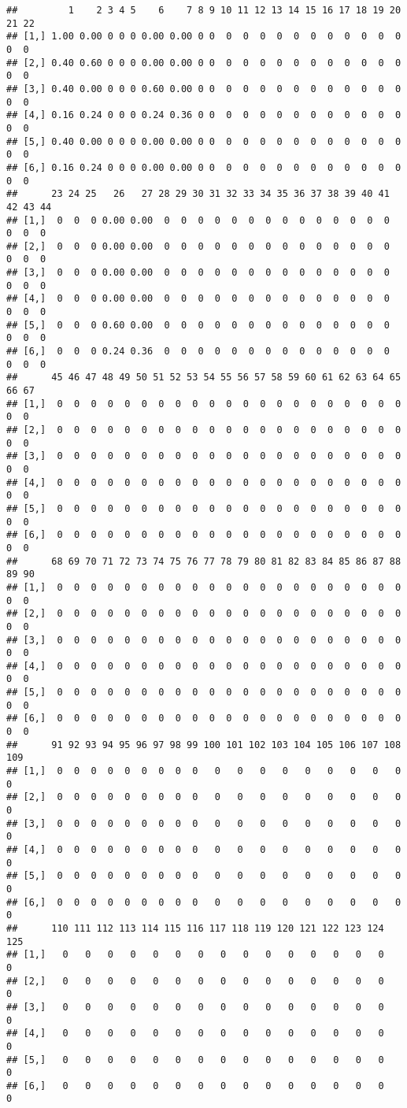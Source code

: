 \documentclass[
]{book}
\begin{document}
\begin{verbatim}
##         1    2 3 4 5    6    7 8 9 10 11 12 13 14 15 16 17 18 19 20 21 22
## [1,] 1.00 0.00 0 0 0 0.00 0.00 0 0  0  0  0  0  0  0  0  0  0  0  0  0  0
## [2,] 0.40 0.60 0 0 0 0.00 0.00 0 0  0  0  0  0  0  0  0  0  0  0  0  0  0
## [3,] 0.40 0.00 0 0 0 0.60 0.00 0 0  0  0  0  0  0  0  0  0  0  0  0  0  0
## [4,] 0.16 0.24 0 0 0 0.24 0.36 0 0  0  0  0  0  0  0  0  0  0  0  0  0  0
## [5,] 0.40 0.00 0 0 0 0.00 0.00 0 0  0  0  0  0  0  0  0  0  0  0  0  0  0
## [6,] 0.16 0.24 0 0 0 0.00 0.00 0 0  0  0  0  0  0  0  0  0  0  0  0  0  0
##      23 24 25   26   27 28 29 30 31 32 33 34 35 36 37 38 39 40 41 42 43 44
## [1,]  0  0  0 0.00 0.00  0  0  0  0  0  0  0  0  0  0  0  0  0  0  0  0  0
## [2,]  0  0  0 0.00 0.00  0  0  0  0  0  0  0  0  0  0  0  0  0  0  0  0  0
## [3,]  0  0  0 0.00 0.00  0  0  0  0  0  0  0  0  0  0  0  0  0  0  0  0  0
## [4,]  0  0  0 0.00 0.00  0  0  0  0  0  0  0  0  0  0  0  0  0  0  0  0  0
## [5,]  0  0  0 0.60 0.00  0  0  0  0  0  0  0  0  0  0  0  0  0  0  0  0  0
## [6,]  0  0  0 0.24 0.36  0  0  0  0  0  0  0  0  0  0  0  0  0  0  0  0  0
##      45 46 47 48 49 50 51 52 53 54 55 56 57 58 59 60 61 62 63 64 65 66 67
## [1,]  0  0  0  0  0  0  0  0  0  0  0  0  0  0  0  0  0  0  0  0  0  0  0
## [2,]  0  0  0  0  0  0  0  0  0  0  0  0  0  0  0  0  0  0  0  0  0  0  0
## [3,]  0  0  0  0  0  0  0  0  0  0  0  0  0  0  0  0  0  0  0  0  0  0  0
## [4,]  0  0  0  0  0  0  0  0  0  0  0  0  0  0  0  0  0  0  0  0  0  0  0
## [5,]  0  0  0  0  0  0  0  0  0  0  0  0  0  0  0  0  0  0  0  0  0  0  0
## [6,]  0  0  0  0  0  0  0  0  0  0  0  0  0  0  0  0  0  0  0  0  0  0  0
##      68 69 70 71 72 73 74 75 76 77 78 79 80 81 82 83 84 85 86 87 88 89 90
## [1,]  0  0  0  0  0  0  0  0  0  0  0  0  0  0  0  0  0  0  0  0  0  0  0
## [2,]  0  0  0  0  0  0  0  0  0  0  0  0  0  0  0  0  0  0  0  0  0  0  0
## [3,]  0  0  0  0  0  0  0  0  0  0  0  0  0  0  0  0  0  0  0  0  0  0  0
## [4,]  0  0  0  0  0  0  0  0  0  0  0  0  0  0  0  0  0  0  0  0  0  0  0
## [5,]  0  0  0  0  0  0  0  0  0  0  0  0  0  0  0  0  0  0  0  0  0  0  0
## [6,]  0  0  0  0  0  0  0  0  0  0  0  0  0  0  0  0  0  0  0  0  0  0  0
##      91 92 93 94 95 96 97 98 99 100 101 102 103 104 105 106 107 108 109
## [1,]  0  0  0  0  0  0  0  0  0   0   0   0   0   0   0   0   0   0   0
## [2,]  0  0  0  0  0  0  0  0  0   0   0   0   0   0   0   0   0   0   0
## [3,]  0  0  0  0  0  0  0  0  0   0   0   0   0   0   0   0   0   0   0
## [4,]  0  0  0  0  0  0  0  0  0   0   0   0   0   0   0   0   0   0   0
## [5,]  0  0  0  0  0  0  0  0  0   0   0   0   0   0   0   0   0   0   0
## [6,]  0  0  0  0  0  0  0  0  0   0   0   0   0   0   0   0   0   0   0
##      110 111 112 113 114 115 116 117 118 119 120 121 122 123 124 125
## [1,]   0   0   0   0   0   0   0   0   0   0   0   0   0   0   0   0
## [2,]   0   0   0   0   0   0   0   0   0   0   0   0   0   0   0   0
## [3,]   0   0   0   0   0   0   0   0   0   0   0   0   0   0   0   0
## [4,]   0   0   0   0   0   0   0   0   0   0   0   0   0   0   0   0
## [5,]   0   0   0   0   0   0   0   0   0   0   0   0   0   0   0   0
## [6,]   0   0   0   0   0   0   0   0   0   0   0   0   0   0   0   0
\end{verbatim}
\end{document}
